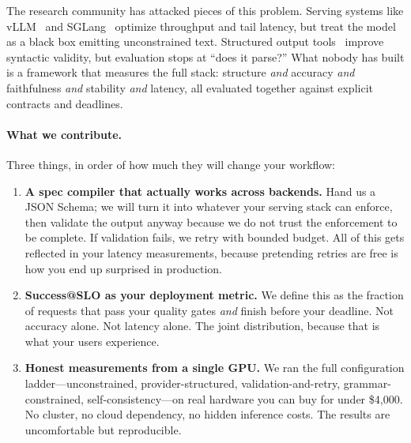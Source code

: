\documentclass[11pt]{article}
\begin{document}
The research community has attacked pieces of this problem.
Serving systems like vLLM~\citep{kwon2023vllm} and SGLang~\citep{zheng2023sglang} optimize throughput and tail latency, but treat the model as a black box emitting unconstrained text.
Structured output tools~\citep{geng2025jsonschemabench,openaiStructuredOutputs} improve syntactic validity, but evaluation stops at ``does it parse?''
What nobody has built is a framework that measures the full stack: structure \emph{and} accuracy \emph{and} faithfulness \emph{and} stability \emph{and} latency, all evaluated together against explicit contracts and deadlines.

\paragraph{What we contribute.}
Three things, in order of how much they will change your workflow:

\begin{enumerate}[leftmargin=12pt]
    \item \textbf{A spec compiler that actually works across backends.}
    Hand us a JSON Schema; we will turn it into whatever your serving stack can enforce, then validate the output anyway because we do not trust the enforcement to be complete.
    If validation fails, we retry with bounded budget.
    All of this gets reflected in your latency measurements, because pretending retries are free is how you end up surprised in production.

    \item \textbf{Success@SLO as your deployment metric.}
    We define this as the fraction of requests that pass your quality gates \emph{and} finish before your deadline.
    Not accuracy alone.
    Not latency alone.
    The joint distribution, because that is what your users experience.

    \item \textbf{Honest measurements from a single GPU.}
    We ran the full configuration ladder---unconstrained, provider-structured, validation-and-retry, grammar-constrained, self-consistency---on real hardware you can buy for under \$4,000.
    No cluster, no cloud dependency, no hidden inference costs.
    The results are uncomfortable but reproducible.
\end{enumerate}
\end{document}
